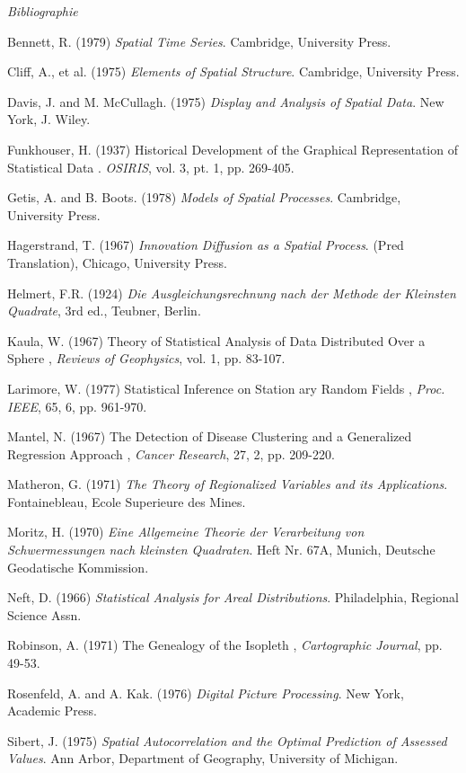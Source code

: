 \documentclass[a4paper,11pt]{article}
\begin{document}
{\parindent0pt
\emph{Bibliographie}

\smallskip

Bennett, R. (1979) \emph{Spatial Time Series}. Cambridge, University Press.

Cliff, A., et al. (1975) \emph{Elements of Spatial Structure}. Cambridge, University Press.

Davis, J. and M. McCullagh. (1975) \emph{Display and Analysis of Spatial Data}. New York, J. Wiley.

Funkhouser, H. (1937) \og Historical Development of the Graphical Representation of Statistical Data \fg. \emph{OSIRIS}, vol. 3, pt. 1, pp. 269-405.

Getis, A. and B. Boots. (1978) \emph{Models of Spatial Processes}. Cambridge, University Press.

Hagerstrand, T. (1967) \emph{Innovation Diffusion as a Spatial Process}. (Pred Translation), Chicago, University Press.

Helmert, F.R. (1924) \emph{Die Ausgleichungsrechnung nach der Methode der Kleinsten Quadrate}, 3rd ed., Teubner, Berlin.

Kaula, W. (1967) \og Theory of Statistical Analysis of Data Distributed Over a Sphere \fg, \emph{Reviews of Geophysics}, vol. 1, pp. 83-107.

Larimore, W. (1977) \og Statistical Inference on Station ary Random Fields \fg, \emph{Proc. IEEE}, 65, 6, pp. 961-970.

Mantel, N. (1967) \og The Detection of Disease Clustering and a Generalized Regression Approach \fg, \emph{Cancer Research}, 27, 2, pp. 209-220. 

Matheron, G. (1971) \emph{The Theory of Regionalized Variables and its Applications}. Fontainebleau, Ecole Superieure des Mines.

Moritz, H. (1970) \emph{Eine Allgemeine Theorie der Verarbeitung von Schwermessungen nach kleinsten Quadraten}. Heft Nr. 67A, Munich, Deutsche Geodatische Kommission.

Neft, D. (1966) \emph{Statistical Analysis for Areal Distributions}. Philadelphia, Regional Science Assn.

Robinson, A. (1971) \og The Genealogy of the Isopleth \fg, \emph{Cartographic Journal}, pp. 49-53.

Rosenfeld, A. and A. Kak. (1976) \emph{Digital Picture Processing}. New York, Academic Press.

Sibert, J. (1975) \emph{Spatial Autocorrelation and the Optimal Prediction of Assessed Values}. Ann Arbor, Department of Geography, University of Michigan.

}
\end{document}
